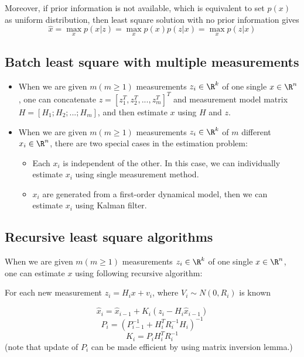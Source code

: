 \begin{refsection}
\begin{remark}
Moreover, if prior information is not available, which is equivalent to set $p(x)$ as uniform distribution, then least square solution with no prior information gives
$$\hat{x} = \max_x p(x|z) = \max_x p(x)p(z|x) =  \max_x p(z|x)$$

\end{remark}


\subsection{Batch least square with multiple measurements}
\begin{mdframed}
	\begin{itemize}
		\item When we are given $m(m\geq 1)$ measurements $z_i\in\R^k$ of one single $x\in\R^n$, one can concatenate $z=[z_1^T, z_2^T, ..., z_m^T ]^T$ and measurement model matrix $H=[H_1;H_2;...;H_m]$, and then estimate $x$ using $H$ and $z$.
		\item When we are given $m(m\geq 1)$ measurements $z_i\in\R^k$ of $m$ different $x_i\in\R^n$, there are two special cases in the estimation problem:
		\begin{itemize}
			\item Each $x_i$ is independent of the other. In this case, we can individually estimate $x_i$ using single measurement method.
			\item $x_i$ are generated from a first-order dynamical model, then we can estimate $x_i$ using Kalman filter.
		\end{itemize}
	\end{itemize}
\end{mdframed}



\subsection{Recursive least square algorithms}\label{ch:estimation-in-dynamical-systems:th:sec:recursiveleastsquare}
 When we are given $m(m\geq 1)$ measurements $z_i\in \R^k$ of one single $x\in \R^n$, one can estimate $x$ using following recursive algorithm:\cite[313]{stengel2012optimal}
 
\begin{algorithm}[H]
	\SetAlgoLined
	For each new measurement $z_i = H_ix + v_i$, where $V_i\sim N(0,R_i)$ is known
	
	$$\hat{x}_i = \hat{x}_{i-1} + K_i(z_i - H_i\hat{x}_{i-1})$$
	$$P_i = (P_{i-1}^{-1} + H_i^TR_i^{-1}H_i)^{-1}$$
	$$K_i = P_iH_i^TR_i^{-1}$$
	(note that update of $P_i$ can be made efficient by using matrix inversion lemma.)
	

\end{algorithm}
\end{refsection}
